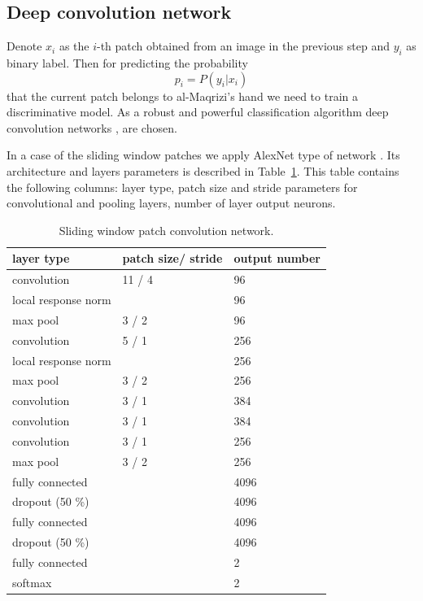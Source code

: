 \documentclass[a4paper,conference]{IEEEtran}
\begin{document}
\subsection{Deep convolution network}

Denote $x_i$ as the $i$-th patch obtained from an image in the previous step and $y_i$ as binary label. Then for predicting the probability
\begin{equation*}
	p_i = P(y_i | x_i)
\end{equation*}
that the current patch belongs to al-Maqrizi's hand we need to train a discriminative model. As a robust and powerful classification algorithm deep convolution networks \cite{DL}, \cite{CNN} are chosen. 

In a case of the sliding window patches we apply AlexNet type of network \cite{Alexnet}. Its architecture and layers parameters is described in Table~\ref{alexnet_tab}. This table contains the following columns: layer type, patch size and stride parameters for convolutional and pooling layers, number of layer output neurons.%
\begin{table}[!b]
\centering
\caption{Sliding window patch convolution network.}
\label{alexnet_tab}
\begin{tabular}{|l|p{1.3cm}|p{1.3cm}|}
\hline
\textbf{layer type} & \textbf{patch size/ stride} & \textbf{output number}  \\
\hline
convolution & 11 / 4 & 96 \\
\hline
local response norm & & 96 \\
\hline
max pool & 3 / 2 & 96 \\
\hline
convolution & 5 / 1 & 256 \\
\hline
local response norm & & 256 \\
\hline
max pool & 3 / 2 & 256 \\
\hline
convolution & 3 / 1 & 384 \\
\hline
convolution & 3 / 1 & 384 \\
\hline
convolution & 3 / 1 & 256 \\
\hline
max pool & 3 / 2 & 256 \\
\hline
fully connected & & 4096 \\
\hline
dropout (50 \%) & & 4096 \\
\hline
fully connected & & 4096 \\
\hline
dropout (50 \%) & & 4096 \\
\hline
fully connected & & 2 \\
\hline
softmax & & 2 \\
\hline
\end{tabular}
\end{table}
\end{document}

